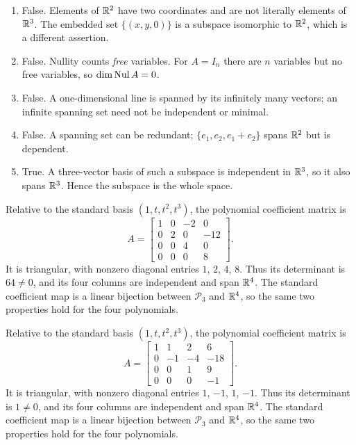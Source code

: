 \begin{enumerate}[label=(\alph*)]
\item False. Elements of $\mathbb{R}^2$ have two coordinates and are not
literally elements of $\mathbb{R}^3$. The embedded set $\{(x,y,0)\}$ is a
subspace isomorphic to $\mathbb{R}^2$, which is a different assertion.
\item False. Nullity counts \emph{free} variables. For $A=I_n$ there
are $n$ variables but no free variables, so $\dim\operatorname{Nul} A=0$.
\item False. A one-dimensional line is spanned by its infinitely many
vectors; an infinite spanning set need not be independent or minimal.
\item False. A spanning set can be redundant; $\{e_1,e_2,e_1+e_2\}$
spans $\mathbb{R}^2$ but is dependent.
\item True. A three-vector basis of such a subspace is independent in
$\mathbb{R}^3$, so it also spans $\mathbb{R}^3$. Hence the subspace is the whole space.
\end{enumerate}

Relative to the standard basis $(1,t,t^2,t^3)$, the polynomial coefficient matrix is
\[A=\left[\begin{array}{rrrr}1&0&-2&0\\0&2&0&-12\\0&0&4&0\\0&0&0&8\end{array}\right].\]
It is triangular, with nonzero diagonal entries $1$, $2$, $4$, $8$. Thus its determinant is $64\ne0$, and its four columns are independent and span $\mathbb{R}^4$.
The standard coefficient map is a linear bijection between $\mathcal P_3$ and $\mathbb{R}^4$, so the same two properties hold for the four polynomials.

Relative to the standard basis $(1,t,t^2,t^3)$, the polynomial coefficient matrix is
\[A=\left[\begin{array}{rrrr}1&1&2&6\\0&-1&-4&-18\\0&0&1&9\\0&0&0&-1\end{array}\right].\]
It is triangular, with nonzero diagonal entries $1$, $-1$, $1$, $-1$. Thus its determinant is $1\ne0$, and its four columns are independent and span $\mathbb{R}^4$.
The standard coefficient map is a linear bijection between $\mathcal P_3$ and $\mathbb{R}^4$, so the same two properties hold for the four polynomials.

